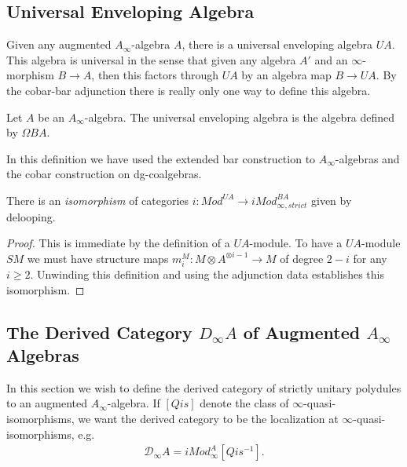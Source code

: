 \documentclass[../thesis.tex]{subfiles}
\begin{document}
        \subsection{Universal Enveloping Algebra}

            Given any augmented $A_\infty$-algebra $A$, there is a universal enveloping algebra $UA$. This algebra is universal in the sense that given any algebra $A'$ and an $\infty$-morphism  $B \rightarrow A$, then this factors through $UA$ by an algebra map $B \rightarrow UA$. By the cobar-bar adjunction there is really only one way to define this algebra.

            \begin{definition}
                Let $A$ be an $A_\infty$-algebra. The universal enveloping algebra is the algebra defined by $\Omega BA$.
            \end{definition}
            \begin{remark}
                In this definition we have used the extended bar construction to $A_\infty$-algebras and the cobar construction on dg-coalgebras.
            \end{remark}

            \begin{lemma}
                There is an \textit{isomorphism} of categories $i : Mod^{UA} \rightarrow iMod_{\infty, strict}^{BA}$ given by delooping.
            \end{lemma}
            \begin{proof}
                This is immediate by the definition of a $UA$-module. To have a $UA$-module $SM$ we must have structure maps $m_i^M : M \otimes A^{\otimes i-1} \rightarrow M$ of degree $2-i$ for any $i \geq 2$. Unwinding this definition and using the adjunction data establishes this isomorphism.
            \end{proof}

        \subsection{The Derived Category $D_\infty A$ of Augmented $A_\infty$ Algebras} 

            In this section we wish to define the derived category of strictly unitary polydules to an augmented $A_\infty$-algebra. If $[Qis]$ denote the class of $\infty$-quasi-isomorphisms, we want the derived category to be the localization at $\infty$-quasi-isomorphisms, e.g.
            \begin{align*}
                \mathcal{D}_\infty A = iMod_\infty^A[Qis^{-1}].
            \end{align*}
\end{document}
